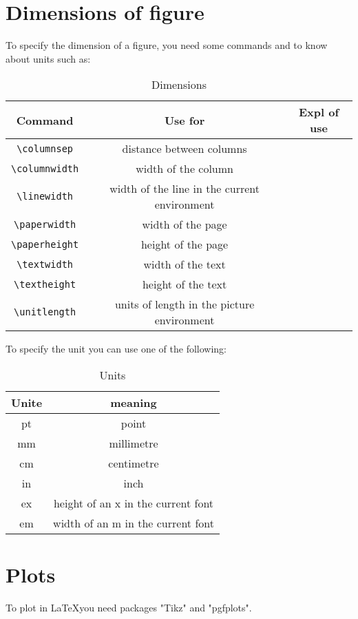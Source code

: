 \section{Dimensions of figure}
To specify the dimension of a figure, you need some commands and to know about units such as:\\
\begin{table}[H]
	\centering
	\begin{tabular}{|c|c|c|}
		\hline
		Command & Use for & Expl of use \\ \hline
		\verb=\columnsep= & distance between columns & \the \columnsep \\ \hline
		\verb=\columnwidth= &	width of the column  & \the \columnwidth \\ \hline
		\verb=\linewidth= &	width of the line in the current environment  & \the \linewidth \\\hline
		\verb=\paperwidth= & width of the page  & \the \paperwidth \\\hline
		\verb=\paperheight= & height of the page  & \the \paperheight \\\hline
		\verb=\textwidth= & width of the text  & \the \textwidth \\\hline
		\verb=\textheight= & height of the text  & \the \textheight \\\hline
		\verb=\unitlength= & units of length in the picture environment  & \the \unitlength \\\hline
	\end{tabular} 
	\caption{Dimensions}
	\label{tab:Dim_tab}
\end{table}
To specify the unit you can use one of the following:
\begin{table}[H]
	\centering
	\begin{tabular}{|c|c|}
		\hline
		Unite & meaning  \\ \hline
		pt & point  \\ \hline 
		mm & millimetre  \\ \hline 
		cm & centimetre  \\ \hline 
		in & inch  \\ \hline 
		ex & height of an x in the current font \\ \hline
		em & width of an m in the current font  \\ \hline 
	\end{tabular}
	\caption{Units}
	\label{tab:Uni_tab}
\end{table}
\section{Plots}
To plot in \LaTeX you need packages "Tikz" and "pgfplots". 
